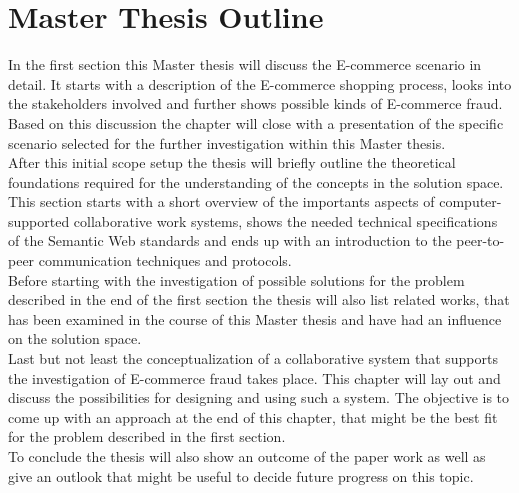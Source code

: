 
\section{Master Thesis Outline}
\label{sec:thesis_outline}

In the first section this Master thesis will discuss the E-commerce scenario in detail. It starts with a description of the E-commerce shopping process, looks into the stakeholders involved and further shows possible kinds of E-commerce fraud. Based on this discussion the chapter will close with a presentation of the specific scenario selected for the further investigation within this Master thesis. \\

After this initial scope setup the thesis will briefly outline the theoretical foundations required for the understanding of the concepts in the solution space. This section starts with a short overview of the importants aspects of computer-supported collaborative work systems, shows the needed technical specifications of the Semantic Web standards and ends up with an introduction to the peer-to-peer communication techniques and protocols. \\

Before starting with the investigation of possible solutions for the problem described in the end of the first section the thesis will also list related works, that has been examined in the course of this Master thesis and have had an influence on the solution space. \\

Last but not least the conceptualization of a collaborative system that supports the investigation of E-commerce fraud takes place. This chapter will lay out and discuss the possibilities for designing and using such a system. The objective is to come up with an approach at the end of this chapter, that might be the best fit for the problem described in the first section. \\

To conclude the thesis will also show an outcome of the paper work as well as give an outlook that might be useful to decide future progress on this topic.

